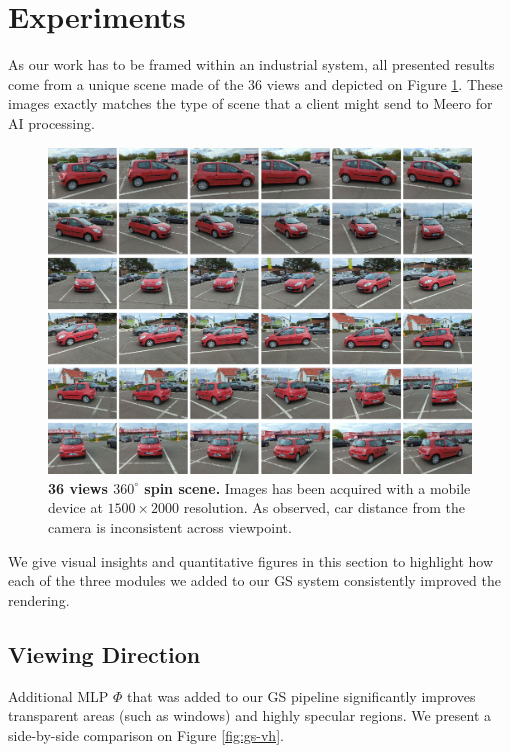 \section{Experiments}
\label{sec:exp-gs}

As our work has to be framed within an industrial system, all presented results come from a unique scene made of the 36 views and depicted on Figure \ref{fig:all_views}. These images exactly matches the type of scene that a client might send to Meero for \ac{AI} processing.

\begin{figure}[htpb!]
  \center
\includegraphics[width=.9\linewidth]{images/gaussiansplatting/original_scene.png}
\caption{\textbf{36 views $360^{\circ}$ spin scene.} Images has been acquired with a mobile device at $1500\times 2000$ resolution. As observed, car distance from the camera is inconsistent across viewpoint.}
\label{fig:all_views}
\end{figure}

We give visual insights and quantitative figures in this section to highlight how each of the three modules we added to our \ac{GS} system consistently improved the rendering. 

\subsection{Viewing Direction}

Additional \ac{MLP} $\Phi$ that was added to our \ac{GS} pipeline significantly improves transparent areas (such as windows) and highly specular regions. We present a side-by-side comparison on Figure \ref{fig:gs-vh}. 

